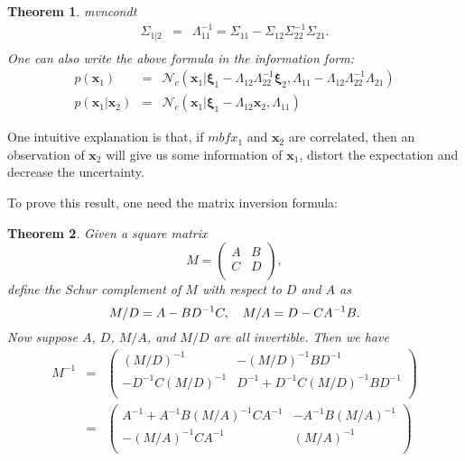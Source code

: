 \documentclass[openany]{book}
\newtheorem{theorem}{Theorem}[chapter]
\begin{document}
\begin{theorem}{mvncondt}
\begin{equation}
\begin{array}{rcl}
\Sigma_{1|2} & = & \Lambda_{11}^{-1}=\Sigma_{11}-\Sigma_{12}\Sigma_{22}^{-1}\Sigma_{21}. \\
\end{array}
\end{equation}
One can also write the above formula in the information form:
\begin{equation}
\begin{array}{rcl}
p(\mathbf{x}_1) & = & \mathcal{N}_c(\mathbf{x}_1|\boldsymbol{\xi}_1-\Lambda_{12}\Lambda_{22}^{-1}\boldsymbol{\xi}_2, \Lambda_{11}-\Lambda_{12}\Lambda_{22}^{-1}\Lambda_{21}) \\
p(\mathbf{x}_1|\mathbf{x}_2) & = & \mathcal{N}_c(\mathbf{x}_1|\boldsymbol{\xi}_1-\Lambda_{12}\mathbf{x}_2,\Lambda_{11})
\end{array}
\end{equation}
\end{theorem}
One intuitive explanation is that, if $mbf{x}_1$ and $\mathbf{x}_2$ are correlated, then an observation of $\mathbf{x}_2$ will give us some information of $\mathbf{x}_1$, distort the expectation and decrease the uncertainty.

To prove this result, one need the matrix inversion formula:
\begin{theorem}\label{matrixinvt}
Given a square matrix
\begin{equation}
M=\left(
\begin{array}{cc}
A & B \\
C & D \\
\end{array}
\right),
\end{equation}
define the Schur complement of $M$ with respect to $D$ and $A$ as
\begin{equation}\label{schurcomp}
M/D=A-BD^{-1}C,\quad M/A=D-CA^{-1}B. \\
\end{equation}
Now suppose $A$, $D$, $M/A$, and $M/D$ are all invertible. Then we have
\begin{equation}\label{maxtrixinv}
\begin{array}{rcl}
M^{-1} & = & \left(
\begin{array}{cc}
(M/D)^{-1} & -(M/D)^{-1}BD^{-1} \\
-D^{-1}C(M/D)^{-1} & D^{-1}+D^{-1}C(M/D)^{-1}BD^{-1} \\
\end{array}
\right) \\
 & = & \left(
 \begin{array}{cc}
 A^{-1}+A^{-1}B(M/A)^{-1}CA^{-1} & -A^{-1}B(M/A)^{-1} \\
-(M/A)^{-1}CA^{-1} & (M/A)^{-1} \\
 \end{array}
 \right) \\
\end{array}
\end{equation}
\end{theorem}
\end{document}

